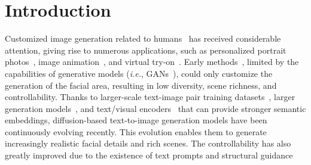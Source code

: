 \section{Introduction}
\label{sec:intro}


Customized image generation related to humans~\cite{ju2023humansd, liu2023hyperhuman, ruiz2023hyperdreambooth} has received considerable attention, giving rise to numerous applications, such as personalized portrait photos~\cite{photoai}, image animation~\cite{zhang2023sadtalker}, and virtual try-on~\cite{wang2018toward}. Early methods~\cite{nitzan2022mystyle, melnik2022face}, limited by the capabilities of generative models (\textit{i.e.}, GANs~\cite{goodfellow2020generative, karras2019style}), could only customize the generation of the facial area, resulting in low diversity, scene richness, and controllability.
Thanks to larger-scale text-image pair training datasets~\cite{schuhmann2022laion}, larger generation models~\cite{saharia2022photorealistic, podell2023sdxl}, and text/visual encoders~\cite{radford2021learning, raffel2020exploring} that can provide stronger semantic embeddings, diffusion-based text-to-image generation models have been continuously evolving recently.
This evolution enables them to generate increasingly realistic facial details and rich scenes.
The controllability has also greatly improved due to the existence of text prompts and structural guidance~\cite{zhang2023adding, mou2023t2i}

